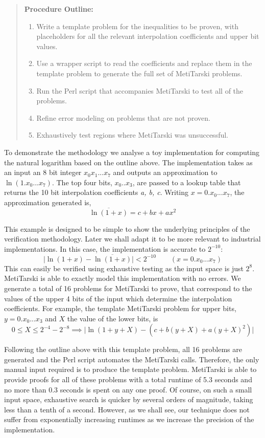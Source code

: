 \documentclass[a4paper]{article}
\newcommand{\abs}[1]{\lvert#1\rvert}
\begin{document}
\begin{quotation}
\textbf{Procedure Outline:}
\begin{enumerate}
\item Write a template problem for the inequalities to be proven, with placeholders for all the relevant interpolation coefficients and upper bit values.
\item Use a wrapper script to read the coefficients and replace them in the template problem to generate the full set of MetiTarski problems.
\item Run the Perl script that accompanies MetiTarski to test all of the problems.
\item Refine error modeling on problems that are not proven.
\item Exhaustively test regions where MetiTarski was unsuccessful.
\end{enumerate}  
\end{quotation}

To demonstrate the methodology we analyse a toy implementation for computing the natural logarithm based on the outline above. The implementation takes as an input an 8 bit integer $x_0x_1...x_7$ and outputs an approximation to $\ln(1.x_0...x_7)$. The top four bits, $x_0..x_3$, are passed to a lookup table that returns the 10 bit interpolation coefficients \textit{a, b, c}. Writing $x=0.x_0...x_7$, the approximation generated is,
$$ \overline{\ln(1+x)}=c + bx +ax^2 $$

This example is designed to be simple to show the underlying principles of the verification methodology. Later we shall adapt it to be more relevant to industrial implementations. In this case, the implementation is accurate to $2^{-10}$:
$$\abs{\ln(1+x)-\overline{\ln(1+x)}} <2^{-10} \qquad (x= 0.x_0...x_7) $$
This can easily be verified using exhaustive testing as the input space is just $2^8$. MetiTarski is able to exactly model this implementation with no errors. We generate a total of 16 problems for MetiTarski to prove, that correspond to the values of the upper 4 bits of the input which determine the interpolation coefficients. For example, the template MetiTarski problem for upper bits, $y=0.x_0...x_3$ and $X$ the value of the lower bits, is
$$ 0\le X \le 2^{-4}-2^{-8} \implies \abs{\ln(1+y+X)-(c+b(y+X)+a(y+X)^2)} $$

Following the outline above with this template problem, all 16 problems are generated and the Perl script automates the MetiTarski calls. Therefore, the only manual input required is to produce the template problem. MetiTarski is able to provide proofs for all of these problems with a total runtime of 5.3 seconds and no more than 0.3 seconds is spent on any one proof. Of course, on such a small input space, exhaustive search is quicker by several orders of magnitude, taking less than a tenth of a second. However, as we shall see, our technique does not suffer from exponentially increasing runtimes as we increase the precision of the implementation.
\end{document}
